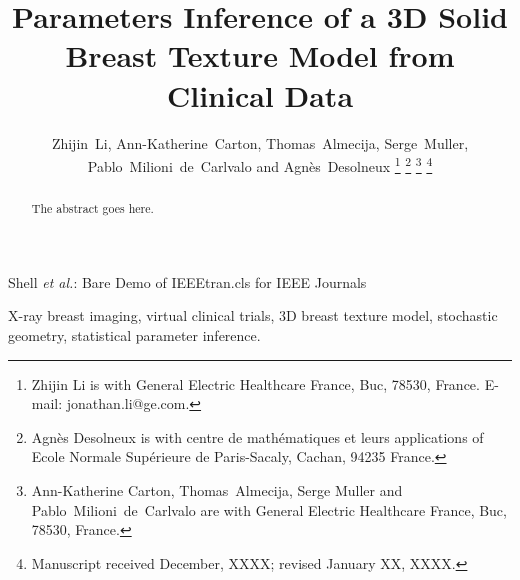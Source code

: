 \documentclass[journal]{IEEEtran}
\begin{document}
\title{Parameters Inference of a 3D Solid Breast Texture Model from
  Clinical Data}

\author{Zhijin~Li, Ann-Katherine~Carton, Thomas~Almecija,
  Serge~Muller, Pablo~Milioni~de~Carlvalo and
  Agnès~Desolneux%
  \thanks{Zhijin Li is with General Electric Healthcare France, Buc,
    78530, France. E-mail:
    jonathan.li@ge.com.}%
  \thanks{Agnès Desolneux is with centre de math\'{e}matiques et leurs
    applications of Ecole Normale Sup\'{e}rieure de Paris-Sacaly,
    Cachan, 94235 France.}%
  \thanks{Ann-Katherine Carton, Thomas~Almecija, Serge Muller and
    Pablo~Milioni~de~Carlvalo are with General Electric Healthcare
    France, Buc, 78530, France.}%
  \thanks{Manuscript received December, XXXX; revised January XX,
    XXXX.}}%
%
%
{Shell \MakeLowercase{\textit{et al.}}: Bare Demo of IEEEtran.cls for
  IEEE Journals}
%



\maketitle

\begin{abstract}
  The abstract goes here.
\end{abstract}

\begin{IEEEkeywords}
  X-ray breast imaging, virtual clinical trials, 3D breast texture
  model, stochastic geometry, statistical parameter inference.
\end{IEEEkeywords}
\end{document}
